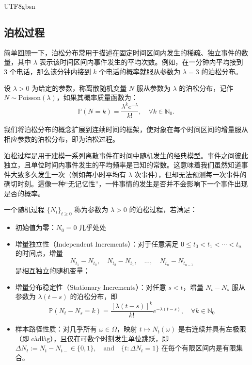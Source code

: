 \documentclass{article}
\begin{document}
\begin{CJK*}{UTF8}{gbsn}
\subsection{泊松过程}

简单回顾一下，泊松分布常用于描述在固定时间区间内发生的稀疏、独立事件的数量，其中 $\lambda$ 表示该时间区间内事件发生的平均次数。例如，在一分钟内平均接到 3 个电话，那么该分钟内接到 $k$ 个电话的概率就服从参数为 $\lambda = 3$ 的泊松分布。

\begin{definition}[泊松分布]
设 $\lambda > 0$ 为给定的参数，称离散随机变量 $N$ 服从参数为 $\lambda$ 的泊松分布，记作 $N \sim \text{Poisson}(\lambda)$，如果其概率质量函数为：
\[
\mathbb{P}(N = k) = \frac{\lambda^k e^{-\lambda}}{k!}, \quad \forall k \in \mathbb{N}_0.
\]
\end{definition}

我们将泊松分布的概念扩展到连续时间的框架，使对象在每个时间区间的增量服从相应参数的泊松分布，即为泊松过程。

泊松过程是用于建模一系列离散事件在时间中随机发生的经典模型。事件之间彼此独立，且单位时间内事件发生的平均频率是已知的常数。这意味着我们虽然知道事件大致多久发生一次（例如每小时平均有 $\lambda$ 次事件），但却无法预测每一次事件的确切时刻。這像一种“无记忆性”，一件事情的发生是否并不会影响下一个事件出现是否的概率。

\begin{definition}[泊松过程]
一个随机过程 $\{N_t\}_{t \geq 0}$ 称为参数为 $\lambda > 0$ 的泊松过程，若满足：
\begin{itemize}
    \item 初始值为零：$N_0 = 0$ 几乎处处
    \item 增量独立性（Independent Increments）：对于任意满足 $0 \leq t_0 < t_1 < \cdots < t_n$ 的时间点，增量
    \[
    N_{t_1} - N_{t_0},\quad N_{t_2} - N_{t_1},\quad \dots,\quad N_{t_n} - N_{t_{n-1}}
    \]
    是相互独立的随机变量；
    \item 增量分布稳定性（Stationary Increments）：对任意 $s < t$，增量 $N_t - N_s$ 服从参数为 $\lambda(t - s)$ 的泊松分布，即
    \[
    \mathbb{P}(N_t - N_s = k) = \frac{[\lambda(t - s)]^k}{k!} e^{-\lambda(t - s)}, \quad \forall k \in \mathbb{N}_0
    \]
    \item 样本路径性质：对几乎所有 $\omega \in \Omega$，映射 $t \mapsto N_t(\omega)$ 是右连续并具有左极限（即 càdlàg），且仅在可数个时刻发生单位跳跃，即$\Delta N_t := N_t - N_{t-} \in \{0, 1\}, \quad \text{and} \quad \{t :\Delta N_t = 1\}$ 在每个有限区间内是有限集合。
\end{itemize}
\end{definition}


\end{CJK*}
\end{document}
